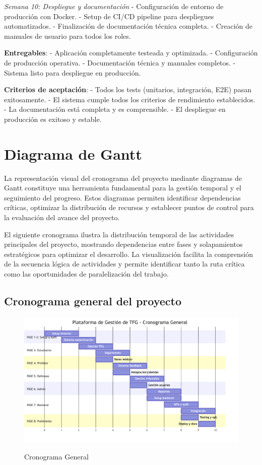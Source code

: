 \documentclass[12pt,a4paper,oneside]{report}
\providecommand{\pandocbounded}[1]{#1}
\begin{document}
\emph{Semana 10: Despliegue y documentación} - Configuración de entorno
de producción con Docker. - Setup de CI/CD pipeline para despliegues
automatizados. - Finalización de documentación técnica completa. -
Creación de manuales de usuario para todos los roles.

\textbf{Entregables}: - Aplicación completamente testeada y optimizada.
- Configuración de producción operativa. - Documentación técnica y
manuales completos. - Sistema listo para despliegue en producción.

\textbf{Criterios de aceptación}: - Todos los tests (unitarios,
integración, E2E) pasan exitosamente. - El sistema cumple todos los
criterios de rendimiento establecidos. - La documentación está completa
y es comprensible. - El despliegue en producción es exitoso y estable.

\section{Diagrama de Gantt}\label{diagrama-de-gantt}

La representación visual del cronograma del proyecto mediante diagramas
de Gantt constituye una herramienta fundamental para la gestión temporal
y el seguimiento del progreso. Estos diagramas permiten identificar
dependencias críticas, optimizar la distribución de recursos y
establecer puntos de control para la evaluación del avance del proyecto.

El siguiente cronograma ilustra la distribución temporal de las
actividades principales del proyecto, mostrando dependencias entre fases
y solapamientos estratégicos para optimizar el desarrollo. La
visualización facilita la comprensión de la secuencia lógica de
actividades y permite identificar tanto la ruta crítica como las
oportunidades de paralelización del trabajo.

\subsection{Cronograma general del
proyecto}\label{cronograma-general-del-proyecto}

\begin{figure}
\centering
\pandocbounded{\includegraphics[keepaspectratio,alt={Cronograma General}]{processed/images/03_planificacion_mermaid_0.png}}
\caption{Cronograma General}
\end{figure}
\end{document}
